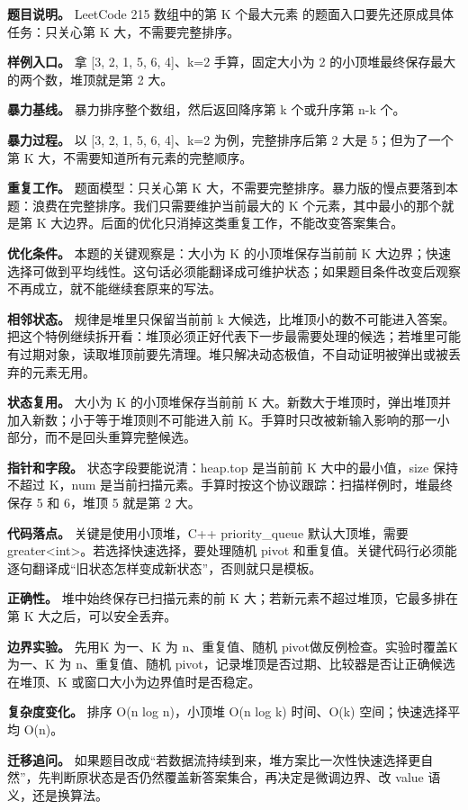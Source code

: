 \textbf{题目说明。} LeetCode 215 数组中的第 K 个最大元素 的题面入口要先还原成具体任务：只关心第 K 大，不需要完整排序。

\textbf{样例入口。} 拿 [3, 2, 1, 5, 6, 4]、k=2 手算，固定大小为 2 的小顶堆最终保存最大的两个数，堆顶就是第 2 大。

\textbf{暴力基线。} 暴力排序整个数组，然后返回降序第 k 个或升序第 n-k 个。

\textbf{暴力过程。} 以 [3, 2, 1, 5, 6, 4]、k=2 为例，完整排序后第 2 大是 5；但为了一个第 K 大，不需要知道所有元素的完整顺序。

\textbf{重复工作。} 题面模型：只关心第 K 大，不需要完整排序。暴力版的慢点要落到本题：浪费在完整排序。我们只需要维护当前最大的 K 个元素，其中最小的那个就是第 K 大边界。后面的优化只消掉这类重复工作，不能改变答案集合。

\textbf{优化条件。} 本题的关键观察是：大小为 K 的小顶堆保存当前前 K 大边界；快速选择可做到平均线性。这句话必须能翻译成可维护状态；如果题目条件改变后观察不再成立，就不能继续套原来的写法。

\textbf{相邻状态。} 规律是堆里只保留当前前 k 大候选，比堆顶小的数不可能进入答案。把这个特例继续拆开看：堆顶必须正好代表下一步最需要处理的候选；若堆里可能有过期对象，读取堆顶前要先清理。堆只解决动态极值，不自动证明被弹出或被丢弃的元素无用。

\textbf{状态复用。} 大小为 K 的小顶堆保存当前前 K 大。新数大于堆顶时，弹出堆顶并加入新数；小于等于堆顶则不可能进入前 K。手算时只改被新输入影响的那一小部分，而不是回头重算完整候选。

\textbf{指针和字段。} 状态字段要能说清：heap.top 是当前前 K 大中的最小值，size 保持不超过 K，num 是当前扫描元素。手算时按这个协议跟踪：扫描样例时，堆最终保存 5 和 6，堆顶 5 就是第 2 大。

\textbf{代码落点。} 关键是使用小顶堆，C++ priority\_queue 默认大顶堆，需要 greater<int>。若选择快速选择，要处理随机 pivot 和重复值。关键代码行必须能逐句翻译成“旧状态怎样变成新状态”，否则就只是模板。

\textbf{正确性。} 堆中始终保存已扫描元素的前 K 大；若新元素不超过堆顶，它最多排在第 K 大之后，可以安全丢弃。

\textbf{边界实验。} 先用K 为一、K 为 n、重复值、随机 pivot做反例检查。实验时覆盖K 为一、K 为 n、重复值、随机 pivot，记录堆顶是否过期、比较器是否让正确候选在堆顶、K 或窗口大小为边界值时是否稳定。

\textbf{复杂度变化。} 排序 O(n log n)，小顶堆 O(n log k) 时间、O(k) 空间；快速选择平均 O(n)。

\textbf{迁移追问。} 如果题目改成“若数据流持续到来，堆方案比一次性快速选择更自然”，先判断原状态是否仍然覆盖新答案集合，再决定是微调边界、改 value 语义，还是换算法。

